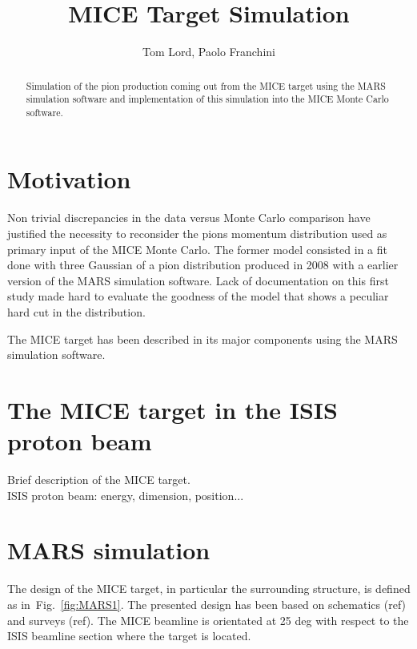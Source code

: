 \documentclass[a4paper,11pt]{article}
\title{MICE Target Simulation}
\author{Tom Lord, Paolo Franchini}
\begin{document}
\maketitle
\tableofcontents

\begin{abstract}
Simulation of the pion production coming out from the MICE target using the MARS simulation software and implementation of this simulation into the MICE Monte Carlo software.
\end{abstract}

\newpage

\section{Motivation}

Non trivial discrepancies in the data versus Monte Carlo comparison have justified the necessity to reconsider the pions momentum distribution used as primary input of the MICE Monte Carlo.
The former model consisted in a fit done with three Gaussian of a pion distribution produced in 2008 with a earlier version of the MARS simulation software. Lack of documentation on this first study made hard to evaluate the goodness of the model that shows a peculiar hard cut in the distribution.

The MICE target has been described in its major components using the MARS simulation software.

\section{The MICE target in the ISIS proton beam}

Brief description of the MICE target.\\
ISIS proton beam: energy, dimension, position...

\section{MARS simulation}

The design of the MICE target, in particular the surrounding structure, is defined as in~Fig.~\ref{fig:MARS1}. The presented design has been based on schematics (ref) and surveys (ref). The MICE beamline is orientated at 25 deg with respect to the ISIS beamline section where the target is located.
\end{document}
